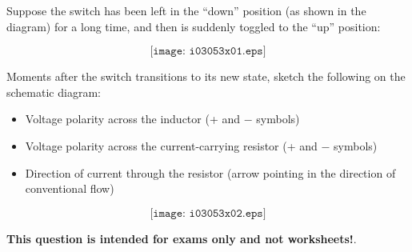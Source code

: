 

Suppose the switch has been left in the ``down'' position (as shown in the diagram) for a long time, and then is suddenly toggled to the ``up'' position:

$$\texttt{[image: i03053x01.eps]}$$

Moments after the switch transitions to its new state, sketch the following on the schematic diagram:

\begin{itemize}
\item{} Voltage polarity across the inductor (+ and $-$ symbols)
\vskip 5pt
\item{} Voltage polarity across the current-carrying resistor (+ and $-$ symbols)
\vskip 5pt
\item{} Direction of current through the resistor (arrow pointing in the direction of conventional flow)
\end{itemize}







$$\texttt{[image: i03053x02.eps]}$$







{\bf This question is intended for exams only and not worksheets!}.


